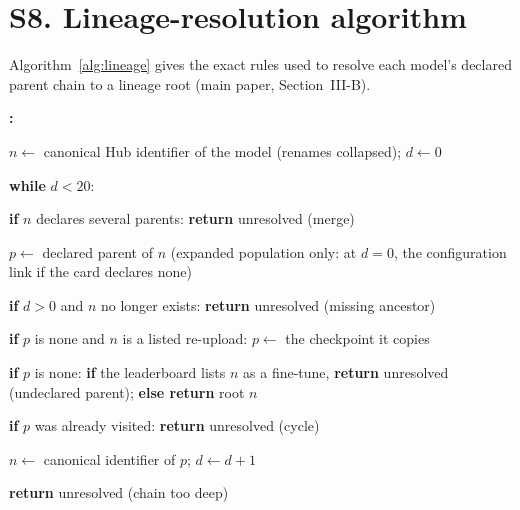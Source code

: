 \documentclass[10pt]{article}
\newcounter{algstep}
\newenvironment{algsteps}{\footnotesize\setcounter{algstep}{0}\begin{list}{\textbf{\thealgstep:}}{\usecounter{algstep}\setlength{\labelwidth}{14pt}\setlength{\labelsep}{4pt}\setlength{\leftmargin}{20pt}\setlength{\itemsep}{1pt}\setlength{\parsep}{0pt}\setlength{\topsep}{3pt}}}{\end{list}}
\newcommand{\algind}[1]{\hspace*{#1.1em}}
\newcommand{\algkw}[1]{\textbf{#1}}
\begin{document}
\section*{S8. Lineage-resolution algorithm}
Algorithm~\ref{alg:lineage} gives the exact rules used to resolve each model's declared parent chain to a lineage root (main paper, Section~III-B).

\begin{algorithm}[H]
\caption{Lineage root of a model}
\label{alg:lineage}
\begin{algsteps}
\item $n \leftarrow$ canonical Hub identifier of the model (renames collapsed); $d \leftarrow 0$
\item \algkw{while} $d < 20$:
\item \algind{1}\algkw{if} $n$ declares several parents: \algkw{return} unresolved (merge)
\item \algind{1}$p \leftarrow$ declared parent of $n$ (expanded population only: at $d = 0$, the configuration link if the card declares none)
\item \algind{1}\algkw{if} $d > 0$ and $n$ no longer exists: \algkw{return} unresolved (missing ancestor)
\item \algind{1}\algkw{if} $p$ is none and $n$ is a listed re-upload: $p \leftarrow$ the checkpoint it copies
\item \algind{1}\algkw{if} $p$ is none: \algkw{if} the leaderboard lists $n$ as a fine-tune, \algkw{return} unresolved (undeclared parent); \algkw{else return} root $n$
\item \algind{1}\algkw{if} $p$ was already visited: \algkw{return} unresolved (cycle)
\item \algind{1}$n \leftarrow$ canonical identifier of $p$; $d \leftarrow d + 1$
\item \algkw{return} unresolved (chain too deep)
\end{algsteps}
\end{algorithm}
\end{document}
